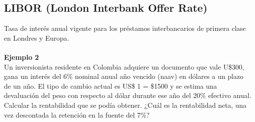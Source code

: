 \subsection{LIBOR (London Interbank Offer Rate)}
Tasa de interés anual vigente para los préstamos interbancarios de primera clase en Londres y Europa.\\ \\



\textbf{Ejemplo 2}\\
Un inversionista residente en Colombia adquiere un documento que vale U\$300, gana un interés del 6\% nominal anual año vencido (naav) en dólares a un plazo de un año. El tipo de cambio actual es US\$ 1 = \$1500 y se estima una devaluación del peso con respecto al dólar durante ese año del 20\% efectivo anual. Calcular la rentabilidad que se podía obtener. ¿Cuál es la rentabilidad neta, una vez descontada la retención en la fuente del 7\%?

